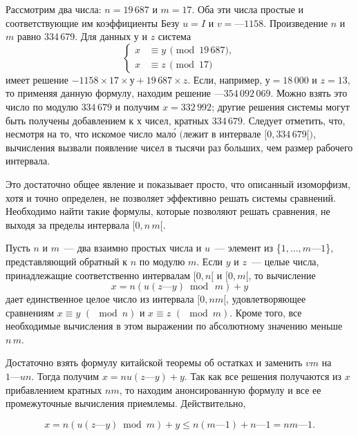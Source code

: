     \begin{beznomera}
    \hspace*{0.5cm}
    Рассмотрим два числа: $n = 19\,687$ и $m = 17$. Оба эти числа простые и соответствующие им коэффициенты Безу $u = I$ и $v = —1158$. Произведение $n$ и $m$ равно 334\,679. Для данных $у$ и $z$ система
    \[
    \left\{
    \begin{aligned}
    x &\equiv y\,\pmod{19\,687},\\
    x &\equiv z\,\pmod{17}
    \end{aligned}
    \right.
    \]
    имеет решение $-1158 \times 17 \times у + 19\,687 \times z$. Если, например, $у = 18\,000$ и $z = 13$, то применяя данную формулу, находим решение $—354\,092\,069$. Можно взять это число по модулю $334\,679$ и получим $x = 332\,992$; другие решения системы могут быть получены добавлением к $х$ чисел, кратных $334\,679$. Следует отметить, что, несмотря на то, что искомое число мало́ $($лежит в интервале $[0, 334\,679 [)$, вычисления вызвали появление чисел в тысячи раз больших, чем размер рабочего интервала.\quad \quad \quad \quad \quad \quad \quad \quad \quad \quad \quad \quad \quad \quad \quad \quad \quad \quad \quad \quad \quad \qedsymbol

    Это достаточно общее явление и показывает просто, что описанный изоморфизм, хотя и точно определен, не позволяет эффективно решать системы сравнений. Необходимо найти такие формулы, которые позволяют решать сравнения, не выходя за пределы интервала $[0,n\,m [$.
    \end{beznomera}

    \begin{bezpodpisi}
    \hspace*{0.5cm}
    Пусть $n$ и $m$~— два взаимно простых числа и $u$~— элемент из \{$1,\ldots,m — 1$\}, представляющий обратный к $n$ по модулю $m$. Если $y$ и $z$~— целые числа, принадлежащие соответственно интервалам $[0, n [$ и $[0, m [$, то вычисление
    $$ x = n ( u (z — y) \bmod\,m) + y$$
    дает единственное целое число из интервала $[0, nm [$, удовлетворяющее сравнениям $x \equiv y\,\,(\!\!\!\mod{n})$ и $x \equiv z\,\,(\!\!\!\mod{m})$. Кроме того, все необходимые вычисления в этом
    выражении по абсолютному значению меньше $n\,m$.
    \end{bezpodpisi}

    \begin{myproof}
    Достаточно взять формулу китайской теоремы об остатках и заменить $vm$ на $1 — un$. Тогда получим $x = nu(z — y) + y$. Так как все решения получаются из $x$ прибавлением кратных $nm$, то находим анонсированную формулу и все ее промежуточные вычисления приемлемы. Действительно,

    $$ x = n(u(z — y) \bmod m) + y \leqslant n(m — 1) + n — 1 = nm — 1. $$
    \end{myproof}

